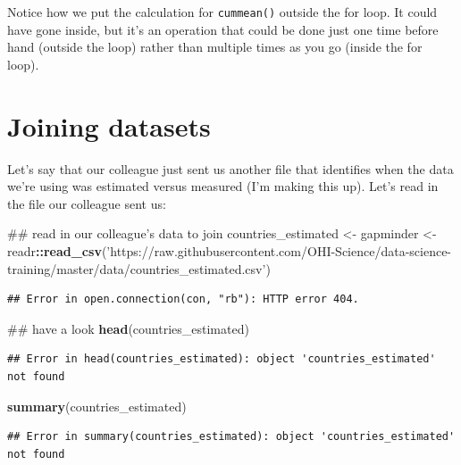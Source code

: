 \documentclass[]{book}
\newenvironment{Shaded}{\begin{snugshade}}{\end{snugshade}}
\newcommand{\KeywordTok}[1]{\textcolor[rgb]{0.13,0.29,0.53}{\textbf{#1}}}
\newcommand{\StringTok}[1]{\textcolor[rgb]{0.31,0.60,0.02}{#1}}
\newcommand{\OperatorTok}[1]{\textcolor[rgb]{0.81,0.36,0.00}{\textbf{#1}}}
\newcommand{\NormalTok}[1]{#1}
\theoremstyle{definition}
\theoremstyle{definition}
\theoremstyle{definition}
\theoremstyle{remark}
\begin{document}
Notice how we put the calculation for \texttt{cummean()} outside the for
loop. It could have gone inside, but it's an operation that could be
done just one time before hand (outside the loop) rather than multiple
times as you go (inside the for loop).

\section{Joining datasets}\label{joining-datasets}

Let's say that our colleague just sent us another file that identifies
when the data we're using was estimated versus measured (I'm making this
up). Let's read in the file our colleague sent us:

\begin{Shaded}
\begin{Highlighting}[]
\NormalTok{## read in our colleague's data to join}
\NormalTok{countries_estimated <-}\StringTok{ }\NormalTok{gapminder <-}\StringTok{ }\NormalTok{readr}\OperatorTok{::}\KeywordTok{read_csv}\NormalTok{(}\StringTok{'https://raw.githubusercontent.com/OHI-Science/data-science-training/master/data/countries_estimated.csv'}\NormalTok{)}
\end{Highlighting}
\end{Shaded}

\begin{verbatim}
## Error in open.connection(con, "rb"): HTTP error 404.
\end{verbatim}

\begin{Shaded}
\begin{Highlighting}[]
\NormalTok{## have a look}
\KeywordTok{head}\NormalTok{(countries_estimated)}
\end{Highlighting}
\end{Shaded}

\begin{verbatim}
## Error in head(countries_estimated): object 'countries_estimated' not found
\end{verbatim}

\begin{Shaded}
\begin{Highlighting}[]
\KeywordTok{summary}\NormalTok{(countries_estimated)}
\end{Highlighting}
\end{Shaded}

\begin{verbatim}
## Error in summary(countries_estimated): object 'countries_estimated' not found
\end{verbatim}
\end{document}
